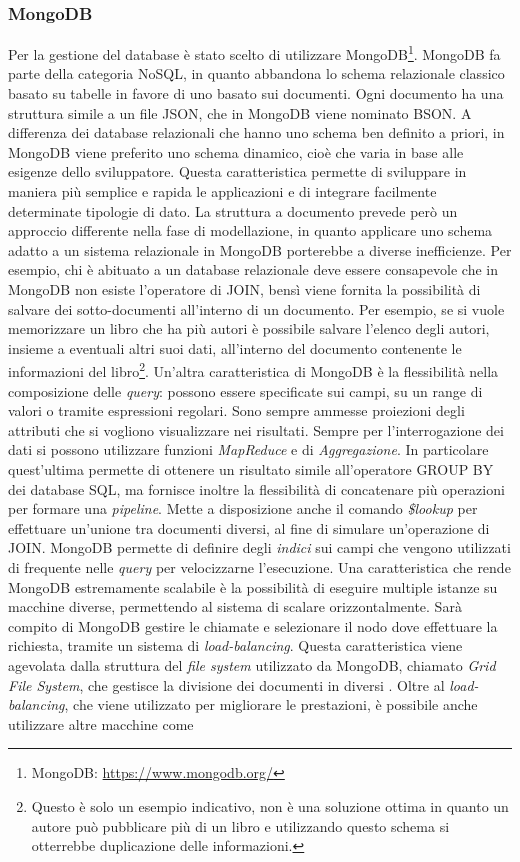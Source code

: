 \subsubsection{MongoDB}

Per la gestione del database è stato scelto di utilizzare MongoDB\footnote{MongoDB: \url{https://www.mongodb.org/}}. MongoDB fa parte della categoria NoSQL, in quanto abbandona lo schema relazionale classico basato su tabelle in favore di uno basato sui documenti. Ogni documento ha una struttura simile a un file JSON, che in MongoDB viene nominato BSON. A differenza dei database relazionali che hanno uno schema ben definito a priori, in MongoDB viene preferito uno schema dinamico, cioè che varia in base alle esigenze dello sviluppatore. Questa caratteristica permette di sviluppare in maniera più semplice e rapida le applicazioni e di integrare facilmente determinate tipologie di dato. La struttura a documento prevede però un approccio differente nella fase di modellazione, in quanto applicare uno schema adatto a un sistema relazionale in MongoDB porterebbe a diverse inefficienze. Per esempio, chi è abituato a un database relazionale deve essere consapevole che in MongoDB non esiste l'operatore di JOIN, bensì viene fornita la possibilità di salvare dei sotto-documenti all'interno di un documento. Per esempio, se si vuole memorizzare un libro che ha più autori è possibile salvare l'elenco degli autori, insieme a eventuali altri suoi dati, all'interno del documento contenente le informazioni del libro\footnote{Questo è solo un esempio indicativo, non è una soluzione ottima in quanto un autore può pubblicare più di un libro e utilizzando questo schema si otterrebbe duplicazione delle informazioni.}. Un'altra caratteristica di MongoDB è la flessibilità nella composizione delle \emph{query}: possono essere specificate sui campi, su un range di valori o tramite espressioni regolari. Sono sempre ammesse proiezioni degli attributi che si vogliono visualizzare nei risultati. Sempre per l'interrogazione dei dati si possono utilizzare funzioni \emph{MapReduce} e di \emph{Aggregazione}. In particolare quest'ultima permette di ottenere un risultato simile all'operatore GROUP BY dei database SQL, ma fornisce inoltre la flessibilità di concatenare più operazioni per formare una \emph{pipeline}. Mette a disposizione anche il comando \emph{\$lookup} per effettuare un'unione tra documenti diversi, al fine di simulare un'operazione di JOIN. MongoDB permette di definire degli \emph{indici} sui campi che vengono utilizzati di frequente nelle \emph{query} per velocizzarne l'esecuzione. Una caratteristica che rende MongoDB estremamente scalabile è la possibilità di eseguire multiple istanze su macchine diverse, permettendo al sistema di scalare orizzontalmente. Sarà compito di MongoDB gestire le chiamate e selezionare il nodo dove effettuare la richiesta, tramite un sistema di \emph{load-balancing}. Questa caratteristica viene agevolata dalla struttura del \emph{file system} utilizzato da MongoDB, chiamato \emph{Grid File System}, che gestisce la divisione dei documenti in diversi . Oltre al \emph{load-balancing}, che viene utilizzato per migliorare le prestazioni, è possibile anche utilizzare altre macchine come 